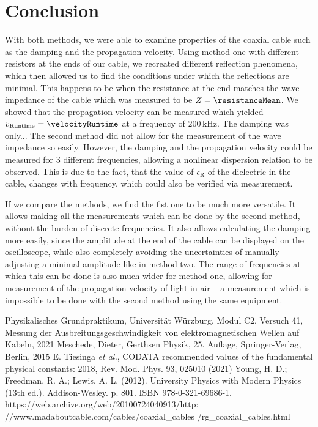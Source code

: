 \documentclass[a4paper,10pt,twocolumn]{article}
\begin{document}
    \section{Conclusion}\label{sec:Conclusion}
    With both methods, we were able to examine properties of the coaxial cable such as the damping and the propagation velocity.
    Using method one with different resistors at the ends of our cable, we recreated different reflection phenomena, which then allowed us to 
    find the conditions under which the reflections are minimal.
    This happens to be when the resistance at the end matches the wave impedance of the cable which was measured to be $Z= \resistanceMean $.
    We showed that the propagation velocity can be measured which yielded $v_{\text{Runtime}}=\velocityRuntime$ at a frequency of $200\,$kHz.
    The damping was only...
    The second method did not allow for the measurement of the wave impedance so easily.
    However, the damping and the propagation velocity could be measured for 3 different frequencies, allowing a nonlinear dispersion relation to be observed.
    This is due to the fact, that the value of $\epsilon_{\text{R}}$ of the dielectric in the cable, changes with frequency, which could also be verified via measurement.
    
    If we compare the methods, we find the fist one to be much more versatile.
    It allows making all the measurements which can be done by the second method, without the burden of discrete frequencies.
    It also allows calculating the damping more easily, since the amplitude at the end of the cable can be displayed on the oscilloscope, while also
    completely avoiding the uncertainties of manually adjusting a minimal amplitude like in method two.
    The range of frequencies at which this can be done is also much wider for method one, allowing for measurement of the propagation velocity of light in air
    -- a measurement which is impossible to be done with the second method using the same equipment.
    
    
    
    \begin{thebibliography}  
         Physikalisches Grundpraktikum, Universität Würzburg, Modul C2, Versuch 41, \grqq Messung der Ausbreitungsgeschwindigkeit von elektromagnetischen Wellen auf Kabeln\grqq, 2021
         Meschede, Dieter, Gerthsen Physik, 25. Auflage, Springer-Verlag, Berlin, 2015
         E. Tiesinga \textit{et al.}, \grqq CODATA recommended values of the fundamental physical constants: 2018\grqq, Rev. Mod. Phys. 93, 025010 (2021)
         Young, H. D.; Freedman, R. A.; Lewis, A. L. (2012). University Physics with Modern Physics (13th ed.). Addison-Wesley. p. 801. ISBN 978-0-321-69686-1.
         https://web.archive.org/web/20100724040913/http: //www.madaboutcable.com/cables/coaxial_cables 
        \newline /rg_coaxial_cables.html 
        \newline
    \end{thebibliography}
    \clearpage
\end{document}
